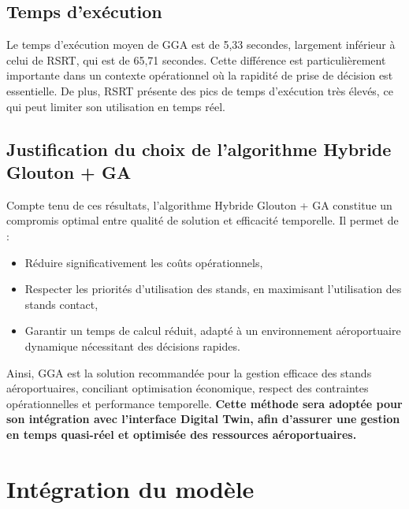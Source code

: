 \subsection{Temps d’exécution}

Le temps d’exécution moyen de GGA est de 5,33 secondes, largement inférieur à celui de RSRT, qui est de 65,71 secondes. Cette différence est particulièrement importante dans un contexte opérationnel où la rapidité de prise de décision est essentielle. De plus, RSRT présente des pics de temps d’exécution très élevés, ce qui peut limiter son utilisation en temps réel.

\subsection{Justification du choix de l’algorithme Hybride Glouton + GA}

Compte tenu de ces résultats, l’algorithme Hybride Glouton + GA constitue un compromis optimal entre qualité de solution et efficacité temporelle. Il permet de :

\begin{itemize}
	\item Réduire significativement les coûts opérationnels,
	\item Respecter les priorités d’utilisation des stands, en maximisant l’utilisation des stands contact,
	\item Garantir un temps de calcul réduit, adapté à un environnement aéroportuaire dynamique nécessitant des décisions rapides.
\end{itemize}

Ainsi, GGA est la solution recommandée pour la gestion efficace des stands aéroportuaires, conciliant optimisation économique, respect des contraintes opérationnelles et performance temporelle. \textbf{Cette méthode sera adoptée pour son intégration avec l’interface Digital Twin, afin d’assurer une gestion en temps quasi-réel et optimisée des ressources aéroportuaires.}

\vspace{-1.3em}
\section{Intégration du modèle}
\vspace{-1em}

